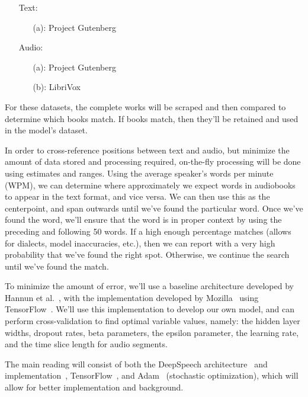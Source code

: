 \documentclass{article}
\begin{document}
\begin{enumerate}
  \item[Text:]\begin{enumerate}
    \item[(a):] Project Gutenberg \cite{Gutenberg-2018-10-04}
  \end{enumerate}
  \item[Audio:]\begin{enumerate}
    \item[(a):] Project Gutenberg \cite{Gutenberg-2018-10-04}
    \item[(b):] LibriVox \cite{LibriVoxfreepublicdomainaudiobooks-2018-10-04}
  \end{enumerate}
\end{enumerate}

For these datasets, the complete works will be scraped and then compared to determine which books match. If books match, then they'll be retained and used in the model's dataset.

In order to cross-reference positions between text and audio, but minimize the amount of data stored and processing required, on-the-fly processing will be done using estimates and ranges. Using the average speaker's words per minute (WPM), we can determine where approximately we expect words in audiobooks to appear in the text format, and vice versa. We can then use this as the centerpoint, and span outwards until we've found the particular word. Once we've found the word, we'll ensure that the word is in proper context by using the preceding and following 50 words. If a high enough percentage matches (allows for dialects, model inaccuracies, etc.), then we can report with a very high probability that we've found the right spot. Otherwise, we continue the search until we've found the match.

To minimize the amount of error, we'll use a baseline architecture developed by Hannun et al.~\cite{DBLP:journals/corr/HannunCCCDEPSSCN14}, with the implementation developed by Mozilla~\cite{mozillaDeepSpeechATensorFlowimplementationofBaidusDeepSpeecharchitecture-2018-10-04} using TensorFlow~\cite{TensorFlow-2018-08-08}. We'll use this implementation to develop our own model, and can perform cross-validation to find optimal variable values, namely: the hidden layer widths, dropout rates, beta parameters, the epsilon parameter, the learning rate, and the time slice length for audio segments.

The main reading will consist of both the DeepSpeech architecture~\cite{DBLP:journals/corr/HannunCCCDEPSSCN14} and implementation~\cite{mozillaDeepSpeechATensorFlowimplementationofBaidusDeepSpeecharchitecture-2018-10-04}, TensorFlow~\cite{TensorFlow-2018-08-08}, and Adam~\cite{DBLP:journals/corr/KingmaB14} (stochastic optimization), which will allow for better implementation and background.
\end{document}
